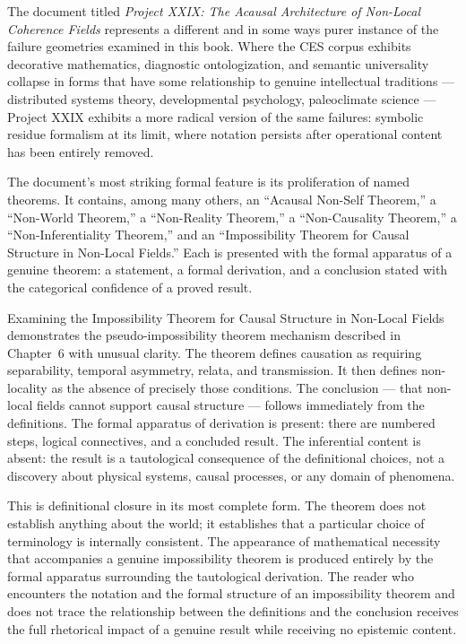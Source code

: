 \documentclass[12pt, openright, twoside]{book}
\begin{document}
The document titled \textit{Project XXIX: The Acausal Architecture of
Non-Local Coherence Fields} represents a different and in some ways purer
instance of the failure geometries examined in this book. Where the CES
corpus exhibits decorative mathematics, diagnostic ontologization, and semantic
universality collapse in forms that have some relationship to genuine intellectual
traditions --- distributed systems theory, developmental psychology, paleoclimate
science --- Project XXIX exhibits a more radical version of the same failures:
symbolic residue formalism at its limit, where notation persists after operational
content has been entirely removed.

The document's most striking formal feature is its proliferation of named
theorems. It contains, among many others, an ``Acausal Non-Self Theorem,''
a ``Non-World Theorem,'' a ``Non-Reality Theorem,'' a ``Non-Causality Theorem,''
a ``Non-Inferentiality Theorem,'' and an ``Impossibility Theorem for Causal
Structure in Non-Local Fields.'' Each is presented with the formal apparatus
of a genuine theorem: a statement, a formal derivation, and a conclusion stated
with the categorical confidence of a proved result.

Examining the Impossibility Theorem for Causal Structure in Non-Local Fields
demonstrates the pseudo-impossibility theorem mechanism described in Chapter~6
with unusual clarity. The theorem defines causation as requiring separability,
temporal asymmetry, relata, and transmission. It then defines non-locality as
the absence of precisely those conditions. The conclusion --- that non-local
fields cannot support causal structure --- follows immediately from the
definitions. The formal apparatus of derivation is present: there are numbered
steps, logical connectives, and a concluded result. The inferential content
is absent: the result is a tautological consequence of the definitional choices,
not a discovery about physical systems, causal processes, or any domain of
phenomena.

This is definitional closure in its most complete form. The theorem does not
establish anything about the world; it establishes that a particular choice of
terminology is internally consistent. The appearance of mathematical necessity
that accompanies a genuine impossibility theorem is produced entirely by the
formal apparatus surrounding the tautological derivation. The reader who
encounters the notation and the formal structure of an impossibility theorem
and does not trace the relationship between the definitions and the conclusion
receives the full rhetorical impact of a genuine result while receiving no
epistemic content.
\end{document}
